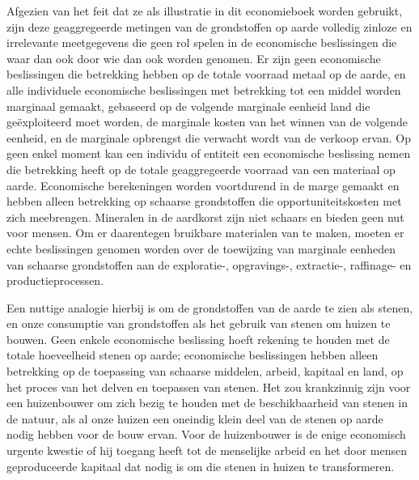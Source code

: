Afgezien van het feit dat ze als illustratie in dit economieboek worden
gebruikt, zijn deze geaggregeerde metingen van de grondstoffen op aarde
volledig zinloze en irrelevante meetgegevens die geen rol spelen in de
economische beslissingen die waar dan ook door wie dan ook worden
genomen. Er zijn geen economische beslissingen die betrekking hebben op
de totale voorraad metaal op de aarde, en alle individuele economische
beslissingen met betrekking tot een middel worden marginaal gemaakt,
gebaseerd op de volgende marginale eenheid land die geëxploiteerd moet
worden, de marginale kosten van het winnen van de volgende eenheid, en
de marginale opbrengst die verwacht wordt van de verkoop ervan. Op geen
enkel moment kan een individu of entiteit een economische beslissing
nemen die betrekking heeft op de totale geaggregeerde voorraad van een
materiaal op aarde. Economische berekeningen worden voortdurend in de
marge gemaakt en hebben alleen betrekking op schaarse grondstoffen die
opportuniteitskosten met zich meebrengen. Mineralen in de aardkorst zijn
niet schaars en bieden geen nut voor mensen. Om er daarentegen bruikbare
materialen van te maken, moeten er echte beslissingen genomen worden
over de toewijzing van marginale eenheden van schaarse grondstoffen aan
de exploratie-, opgravings-, extractie-, raffinage- en
productieprocessen.

Een nuttige analogie hierbij is om de grondstoffen van de aarde te zien
als stenen, en onze consumptie van grondstoffen als het gebruik van
stenen om huizen te bouwen. Geen enkele economische beslissing hoeft
rekening te houden met de totale hoeveelheid stenen op aarde;
economische beslissingen hebben alleen betrekking op de toepassing van
schaarse middelen, arbeid, kapitaal en land, op het proces van het
delven en toepassen van stenen. Het zou krankzinnig zijn voor een
huizenbouwer om zich bezig te houden met de beschikbaarheid van stenen
in de natuur, als al onze huizen een oneindig klein deel van de stenen
op aarde nodig hebben voor de bouw ervan. Voor de huizenbouwer is de enige economisch urgente kwestie of hij toegang heeft tot de menselijke arbeid en het door mensen geproduceerde kapitaal dat nodig is om die stenen in huizen te transformeren.


